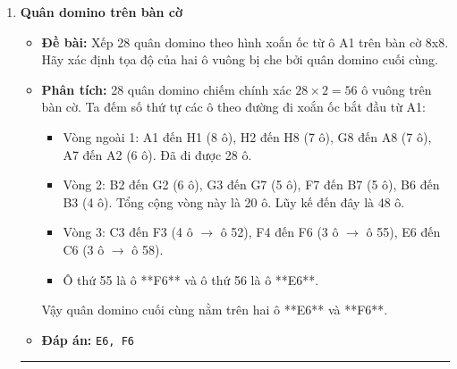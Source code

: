 \documentclass[11pt,a4paper]{article}
\begin{document}
\begin{enumerate}[label=\textbf{Câu \arabic*:}, leftmargin=*]
\item \textbf{Quân domino trên bàn cờ}
    \begin{itemize}
        \item \textbf{Đề bài:} Xếp 28 quân domino theo hình xoắn ốc từ ô A1 trên bàn cờ 8x8. Hãy xác định tọa độ của hai ô vuông bị che bởi quân domino cuối cùng.
        \item \textbf{Phân tích:}
            28 quân domino chiếm chính xác $28 \times 2 = 56$ ô vuông trên bàn cờ. Ta đếm số thứ tự các ô theo đường đi xoắn ốc bắt đầu từ A1:
            \begin{itemize}
                \item Vòng ngoài 1: A1 đến H1 (8 ô), H2 đến H8 (7 ô), G8 đến A8 (7 ô), A7 đến A2 (6 ô). Đã đi được 28 ô.
                \item Vòng 2: B2 đến G2 (6 ô), G3 đến G7 (5 ô), F7 đến B7 (5 ô), B6 đến B3 (4 ô). Tổng cộng vòng này là 20 ô. Lũy kế đến đây là 48 ô.
                \item Vòng 3: C3 đến F3 (4 ô $\to$ ô 52), F4 đến F6 (3 ô $\to$ ô 55), E6 đến C6 (3 ô $\to$ ô 58).
                \item Ô thứ 55 là ô **F6** và ô thứ 56 là ô **E6**.
            \end{itemize}
            Vậy quân domino cuối cùng nằm trên hai ô **E6** và **F6**.
        \item \textbf{Đáp án:} \texttt{E6, F6}
    \end{itemize}

\hrule
\vspace{0.5cm}


\end{enumerate}
\end{document}
